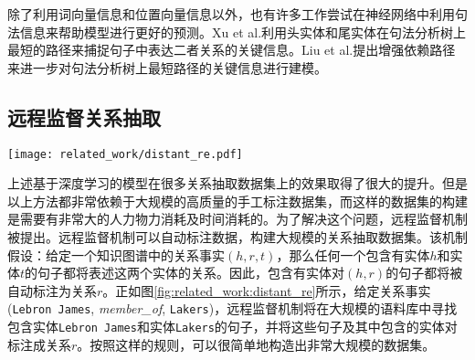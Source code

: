 除了利用词向量信息和位置向量信息以外，也有许多工作尝试在神经网络中利用句法信息来帮助模型进行更好的预测。Xu et al.\cite{xu2015classifying}利用头实体和尾实体在句法分析树上最短的路径来捕捉句子中表达二者关系的关键信息。Liu et al.\cite{liu2015dependency}提出增强依赖路径来进一步对句法分析树上最短路径的关键信息进行建模。


\subsection{远程监督关系抽取}
\begin{figure*}
	\centering
	\texttt{[image: related\_work/distant\_re.pdf]}
	\caption{远程监督关系抽取示例\cite{yao2019docred}。根据关系事实(\texttt{Apple Inc.}, \textit{product}, \texttt{iPhone})，远程监督机制找到所有带有实体\texttt{Apple Inc.}和\texttt{iPhone}的句子，并将它们标注成关系\textit{product}。远程监督机制可以有效扩充数据集，但也不可避免地带来许多噪音。}
	\label{fig:related_work:distant_re}
\end{figure*}

上述基于深度学习的模型在很多关系抽取数据集上的效果取得了很大的提升。但是以上方法都非常依赖于大规模的高质量的手工标注数据集，而这样的数据集的构建是需要有非常大的人力物力消耗及时间消耗的。为了解决这个问题，远程监督机制\cite{mintz2009distant,nguyen2011end,min2013distant}被提出。远程监督机制可以自动标注数据，构建大规模的关系抽取数据集。该机制假设：给定一个知识图谱中的关系事实$(h, r, t)$，那么任何一个包含有实体$h$和实体$t$的句子都将表述这两个实体的关系。因此，包含有实体对$(h, r)$的句子都将被自动标注为关系$r$。正如图\ref{fig:related_work:distant_re}所示，给定关系事实(\texttt{Lebron James}, \textit{member\_of}, \texttt{Lakers})，远程监督机制将在大规模的语料库中寻找包含实体\texttt{Lebron James}和实体\texttt{Lakers}的句子，并将这些句子及其中包含的实体对标注成关系$r$。按照这样的规则，可以很简单地构造出非常大规模的数据集。

